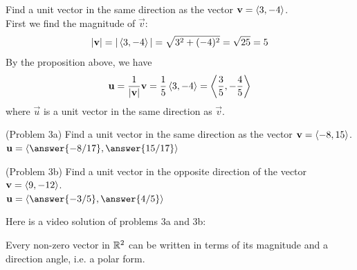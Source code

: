 \documentclass[handout]{ximera}
\begin{document}
\begin{example}[Example 3]
Find a unit vector in the same direction as the vector $\mathbf{v} = \left\langle 3, -4\right\rangle$.\\
First we find the magnitude of $\vec{v}$:
\[
|\mathbf{v}| = |\left\langle 3, -4\right\rangle| = \sqrt{3^2 + (-4)^2} = \sqrt{25} = 5
\]
By the proposition above, we have
\[
\mathbf{u} = \frac{1}{|\mathbf{v}|} \mathbf{v} = \frac15 \left\langle 3, -4\right\rangle = \left\langle \frac35, -\frac45\right\rangle
\]
where $\vec{u}$ is a unit vector in the same direction as $\vec{v}$.
\end{example}

\begin{problem}(Problem 3a)
Find a unit vector in the same direction as the vector $\mathbf{v} = \left\langle -8, 15\right\rangle$.\\
$\vec{u} = \vector{\answer{-8/17}, \answer{15/17}}$
\end{problem}

\begin{problem}(Problem 3b)
Find a unit vector in the opposite direction of the vector $\mathbf{v} = \left\langle 9, -12\right\rangle$.\\
$\vec{u} = \vector{\answer{-3/5}, \answer{4/5}}$
\end{problem}

Here is a video solution of problems 3a and 3b:\\
\begin{foldable}
\end{foldable}

Every non-zero vector in $\mathbb R^2$ can be written in terms of its magnitude and a direction angle, i.e. a polar form.
\end{document}
